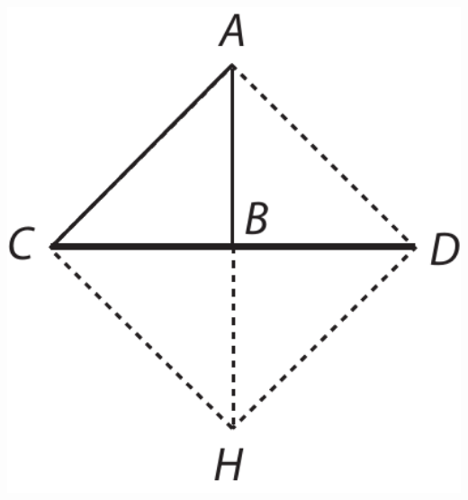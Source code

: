\pend
\pstart
\begin{minipage}[t]{0.28\textwidth}
\hspace*{10mm}
\includegraphics[trim = 0mm -3mm 0mm 0mm, clip, width=1.0\textwidth]{images/LH035,14,02_114r-d7.pdf}
\end{minipage}
\hspace*{38,9mm}
